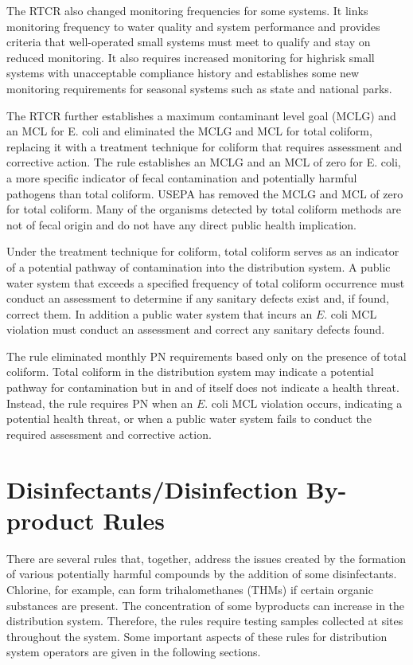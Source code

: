 \documentclass[10pt]{article}
\begin{document}
The RTCR also changed monitoring frequencies for some systems. It links monitoring frequency to water quality and system performance and provides criteria that well-operated small systems must meet to qualify and stay on reduced monitoring. It also requires increased monitoring for highrisk small systems with unacceptable compliance history and establishes some new monitoring requirements for seasonal systems such as state and national parks.

The RTCR further establishes a maximum contaminant level goal (MCLG) and an MCL for E. coli and eliminated the MCLG and MCL for total coliform, replacing it with a treatment technique for coliform that requires assessment and corrective action. The rule establishes an MCLG and an MCL of zero for E. coli, a more specific indicator of fecal contamination and potentially harmful pathogens than total coliform. USEPA has removed the MCLG and MCL of zero for total coliform. Many of the organisms detected by total coliform methods are not of fecal origin and do not have any direct public health implication.

Under the treatment technique for coliform, total coliform serves as an indicator of a potential pathway of contamination into the distribution system. A public water system that exceeds a specified frequency of total coliform occurrence must conduct an assessment to determine if any sanitary defects exist and, if found, correct them. In addition a public water system that incurs an $E$. coli MCL violation must conduct an assessment and correct any sanitary defects found.

The rule eliminated monthly PN requirements based only on the presence of total coliform. Total coliform in the distribution system may indicate a potential pathway for contamination but in and of itself does not indicate a health threat. Instead, the rule requires $\mathrm{PN}$ when an $E$. coli $\mathrm{MCL}$ violation occurs, indicating a potential health threat, or when a public water system fails to conduct the required assessment and corrective action.

\section{Disinfectants/Disinfection By-product Rules}
There are several rules that, together, address the issues created by the formation of various potentially harmful compounds by the addition of some disinfectants. Chlorine, for example, can form trihalomethanes (THMs) if certain organic substances are present. The concentration of some byproducts can increase in the distribution system. Therefore, the rules require testing samples collected at sites throughout the system. Some important aspects of these rules for distribution system operators are given in the following sections.
\end{document}
